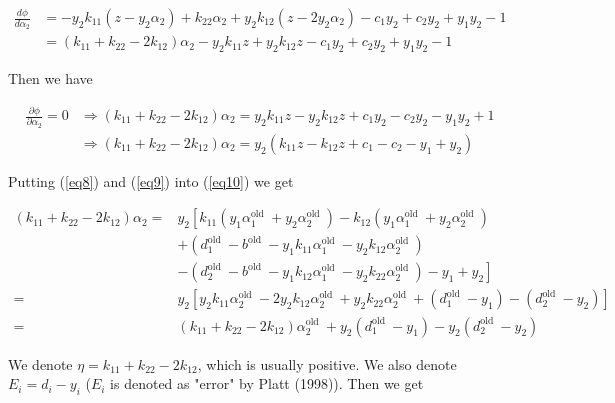 \documentclass{article}
\begin{document}
\begin{equation}
\begin{aligned}
\frac{d \phi}{d \alpha_2} &=-y_2 k_{11}\left(z-y_2 \alpha_2\right)+k_{22} \alpha_2+y_2 k_{12}\left(z-2 y_2 \alpha_2\right)-c_1 y_2+c_2 y_2+y_1 y_2-1 \\
&=\left(k_{11}+k_{22}-2 k_{12}\right) \alpha_2-y_2 k_{11} z+y_2 k_{12} z-c_1 y_2+c_2 y_2+y_1 y_2-1
\end{aligned}
\end{equation}

Then we have

\begin{equation} \label{eq10}
\begin{aligned}
\frac{\partial \phi}{\partial \alpha_2}=0 & \Rightarrow\left(k_{11}+k_{22}-2 k_{12}\right) \alpha_2=y_2 k_{11} z-y_2 k_{12} z+c_1 y_2-c_2 y_2-y_1 y_2+1 \\
& \Rightarrow\left(k_{11}+k_{22}-2 k_{12}\right) \alpha_2=y_2\left(k_{11} z-k_{12} z+c_1-c_2-y_1+y_2\right)
\end{aligned}
\end{equation}

Putting (\ref{eq8}) and (\ref{eq9}) into (\ref{eq10}) we get

\begin{equation} 
\begin{aligned}
\left(k_{11}+k_{22}-2 k_{12}\right) \alpha_2=&y_2 {\left[k_{11}\left(y_1 \alpha_1^{\text {old }}+y_2 \alpha_2^{\text {old }}\right)-k_{12}\left(y_1 \alpha_1^{\text {old }}+y_2 \alpha_2^{\text {old }}\right)\right.} \\
&+\left(d_1^{\text {old }}-b^{\text {old }}-y_1 k_{11} \alpha_1^{\text {old }}-y_2 k_{12} \alpha_2^{\text {old }}\right) \\
&\left.-\left(d_2^{\text {old }}-b^{\text {old }}-y_1 k_{12} \alpha_1^{\text {old }}-y_2 k_{22} \alpha_2^{\text {old }}\right)-y_1+y_2\right] \\
=& y_2\left[y_2 k_{11} \alpha_2^{\text {old }}-2 y_2 k_{12} \alpha_2^{\text {old }}+y_2 k_{22} \alpha_2^{\text {old }}+\left(d_1^{\text {old }}-y_1\right)-\left(d_2^{\text {old }}-y_2\right)\right] \\
=&\left(k_{11}+k_{22}-2 k_{12}\right) \alpha_2^{\text {old }}+y_2\left(d_1^{\text {old }}-y_1\right)-y_2\left(d_2^{\text {old }}-y_2\right)
\end{aligned}
\end{equation}

We denote $\eta = k_{11}+k_{22}-2 k_{12}$, which is usually positive. We also denote $E_i = d_i - y_i$ ($E_i$ is denoted as "error" by Platt (1998)). Then we get
\end{document}
